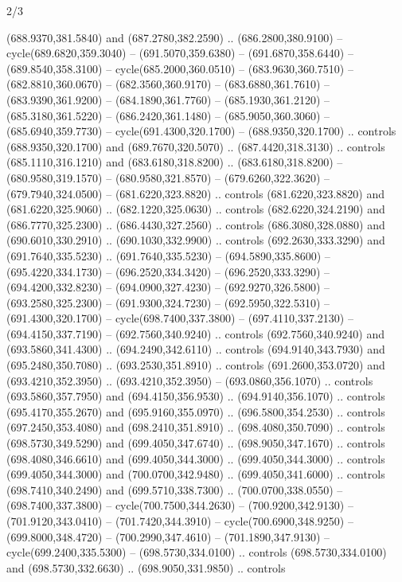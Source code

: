 \begin{flagdescription}{2/3}
\begin{scope}[xshift=0.5\flaglength,yshift=0.5\flagwidth,scale=\flagwidth/638.38]
\begin{scope}[y=0.80pt, x=0.80pt, yscale=-1,shift={(-600,-400)}]
\begin{scope}[shift={(-0.02,2.173)}]
  (688.9370,381.5840) and (687.2780,382.2590) .. (686.2800,380.9100) --
  cycle(689.6820,359.3040) -- (691.5070,359.6380) -- (691.6870,358.6440) --
  (689.8540,358.3100) -- cycle(685.2000,360.0510) -- (683.9630,360.7510) --
  (682.8810,360.0670) -- (682.3560,360.9170) -- (683.6880,361.7610) --
  (683.9390,361.9200) -- (684.1890,361.7760) -- (685.1930,361.2120) --
  (685.3180,361.5220) -- (686.2420,361.1480) -- (685.9050,360.3060) --
  (685.6940,359.7730) -- cycle(691.4300,320.1700) -- (688.9350,320.1700) ..
  controls (688.9350,320.1700) and (689.7670,320.5070) .. (687.4420,318.3130) ..
  controls (685.1110,316.1210) and (683.6180,318.8200) .. (683.6180,318.8200) --
  (680.9580,319.1570) -- (680.9580,321.8570) -- (679.6260,322.3620) --
  (679.7940,324.0500) -- (681.6220,323.8820) .. controls (681.6220,323.8820) and
  (681.6220,325.9060) .. (682.1220,325.0630) .. controls (682.6220,324.2190) and
  (686.7770,325.2300) .. (686.4430,327.2560) .. controls (686.3080,328.0880) and
  (690.6010,330.2910) .. (690.1030,332.9900) .. controls (692.2630,333.3290) and
  (691.7640,335.5230) .. (691.7640,335.5230) -- (694.5890,335.8600) --
  (695.4220,334.1730) -- (696.2520,334.3420) -- (696.2520,333.3290) --
  (694.4200,332.8230) -- (694.0900,327.4230) -- (692.9270,326.5800) --
  (693.2580,325.2300) -- (691.9300,324.7230) -- (692.5950,322.5310) --
  (691.4300,320.1700) -- cycle(698.7400,337.3800) -- (697.4110,337.2130) --
  (694.4150,337.7190) -- (692.7560,340.9240) .. controls (692.7560,340.9240) and
  (693.5860,341.4300) .. (694.2490,342.6110) .. controls (694.9140,343.7930) and
  (695.2480,350.7080) .. (693.2530,351.8910) .. controls (691.2600,353.0720) and
  (693.4210,352.3950) .. (693.4210,352.3950) -- (693.0860,356.1070) .. controls
  (693.5860,357.7950) and (694.4150,356.9530) .. (694.9140,356.1070) .. controls
  (695.4170,355.2670) and (695.9160,355.0970) .. (696.5800,354.2530) .. controls
  (697.2450,353.4080) and (698.2410,351.8910) .. (698.4080,350.7090) .. controls
  (698.5730,349.5290) and (699.4050,347.6740) .. (698.9050,347.1670) .. controls
  (698.4080,346.6610) and (699.4050,344.3000) .. (699.4050,344.3000) .. controls
  (699.4050,344.3000) and (700.0700,342.9480) .. (699.4050,341.6000) .. controls
  (698.7410,340.2490) and (699.5710,338.7300) .. (700.0700,338.0550) --
  (698.7400,337.3800) -- cycle(700.7500,344.2630) -- (700.9200,342.9130) --
  (701.9120,343.0410) -- (701.7420,344.3910) -- cycle(700.6900,348.9250) --
  (699.8000,348.4720) -- (700.2990,347.4610) -- (701.1890,347.9130) --
  cycle(699.2400,335.5300) -- (698.5730,334.0100) .. controls
  (698.5730,334.0100) and (698.5730,332.6630) .. (698.9050,331.9850) .. controls

\end{scope}
\end{scope}
\end{scope}
\end{flagdescription}
